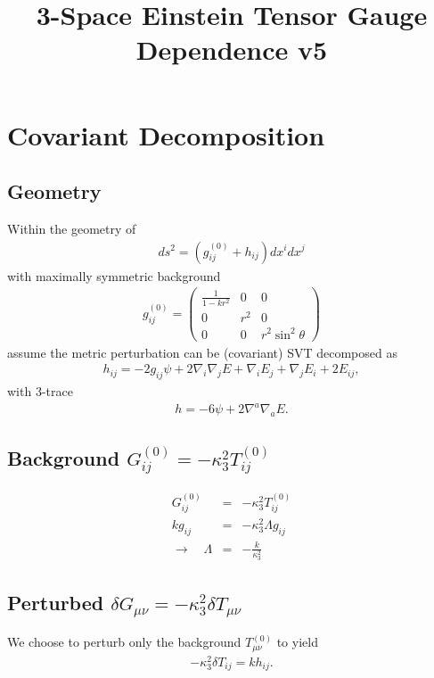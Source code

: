 \documentclass[10pt,letterpaper]{article}
\title{3-Space Einstein Tensor Gauge Dependence v5}
\numberwithin{equation}{section}
\begin{document}
 
\maketitle
\noindent 
\section{Covariant Decomposition}
\subsection{Geometry} 
\label{S1}
Within the geometry of 
\begin{eqnarray}
ds^2 = (g_{ij}^{(0)} + h_{ij})dx^i dx^j 
\end{eqnarray}
with maximally symmetric background
\begin{eqnarray}
g_{ij}^{(0)} = \begin{pmatrix} \frac{1}{1-kr^2} &0&0\\ 0&r^2&0\\0&0&r^2\sin^2\theta\end{pmatrix}
\end{eqnarray}
assume the metric perturbation can be (covariant) SVT decomposed as
\begin{eqnarray}
h_{ij} = -2 g_{ij}\psi + 2\nabla_i\nabla_j E + \nabla_i E_j + \nabla_j E_i + 2E_{ij},
\label{svt}
\end{eqnarray}
with 3-trace
\begin{eqnarray}
h = -6 \psi + 2\nabla^a\nabla_a E.
\end{eqnarray}

\subsection{Background $G^{(0)}_{ij} = - \kappa^2_3 T^{(0)}_{ij}$}
\begin{eqnarray}
G^{(0)}_{ij} &=& - \kappa^2_3 T^{(0)}_{ij}
\nonumber\\
k g_{ij} &=& - \kappa^2_3 \Lambda g_{ij}
\nonumber\\
\to\quad  \Lambda &=& -\frac{k}{\kappa^2_3}
\label{lambdakappa}
\end{eqnarray}

\subsection{Perturbed $\delta G_{\mu\nu} =-\kappa^2_3 \delta T_{\mu\nu}$}
We choose to perturb only the background $T_{\mu\nu}^{(0)}$ to yield
\begin{eqnarray}
-\kappa_3^2 \delta T_{ij} = k h_{ij}.
\end{eqnarray}
\end{document}
